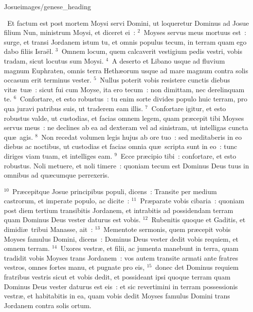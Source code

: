 {Josue}{images/genese_heading}

~\lettrine[lines=10,image=true,loversize=0.05,lraise=-0.03]{E}{}t factum est post mortem Moysi servi Domini, ut loqueretur Dominus ad Josue filium Nun, ministrum Moysi, et diceret ei~:
${}^{2}$~Moyses servus meus mortuus est~: surge, et transi Jordanem istum tu, et omnis populus tecum, in terram quam ego dabo filiis Isra\"el.
${}^{3}$~Omnem locum, quem calcaverit vestigium pedis vestri, vobis tradam, sicut locutus sum Moysi.
${}^{4}$~A deserto et Libano usque ad fluvium magnum Euphraten, omnis terra Heth\ae orum usque ad mare magnum contra solis occasum erit terminus vester.
${}^{5}$~Nullus poterit vobis resistere cunctis diebus vit\ae\ tu\ae~: sicut fui cum Moyse, ita ero tecum~: non dimittam, nec derelinquam te.
${}^{6}$~Confortare, et esto robustus~: tu enim sorte divides populo huic terram, pro qua juravi patribus suis, ut traderem eam illis.
${}^{7}$~Confortare igitur, et esto robustus valde, ut custodias, et facias omnem legem, quam pr\ae cepit tibi Moyses servus meus~: ne declines ab ea ad dexteram vel ad sinistram, ut intelligas cuncta qu\ae\ agis.
${}^{8}$~Non recedat volumen legis hujus ab ore tuo~: sed meditaberis in eo diebus ac noctibus, ut custodias et facias omnia qu\ae\ scripta sunt in eo~: tunc diriges viam tuam, et intelliges eam.
${}^{9}$~Ecce pr\ae cipio tibi~: confortare, et esto robustus. Noli metuere, et noli timere~: quoniam tecum est Dominus Deus tuus in omnibus ad qu\ae cumque perrexeris.


${}^{10}$~Pr\ae cepitque Josue principibus populi, dicens~: Transite per medium castrorum, et imperate populo, ac dicite~:
${}^{11}$~Pr\ae parate vobis cibaria~: quoniam post diem tertium transibitis Jordanem, et intrabitis ad possidendam terram quam Dominus Deus vester daturus est vobis.
${}^{12}$~Rubenitis quoque et Gaditis, et dimidi\ae\ tribui Manasse, ait~:
${}^{13}$~Mementote sermonis, quem pr\ae cepit vobis Moyses famulus Domini, dicens~: Dominus Deus vester dedit vobis requiem, et omnem terram.
${}^{14}$~Uxores vestr\ae , et filii, ac jumenta manebunt in terra, quam tradidit vobis Moyses trans Jordanem~: vos autem transite armati ante fratres vestros, omnes fortes manu, et pugnate pro eis,
${}^{15}$~donec det Dominus requiem fratribus vestris sicut et vobis dedit, et possideant ipsi quoque terram quam Dominus Deus vester daturus est eis~: et sic revertimini in terram possessionis vestr\ae , et habitabitis in ea, quam vobis dedit Moyses famulus Domini trans Jordanem contra solis ortum.


